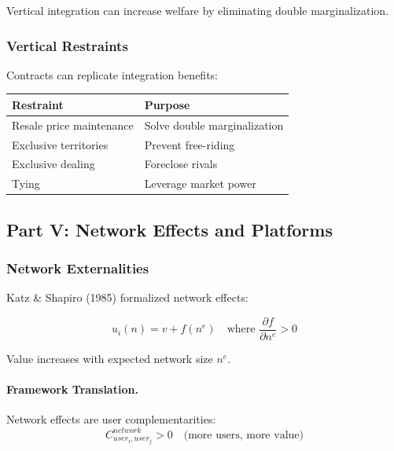 Vertical integration can increase welfare by eliminating double marginalization.

\subsubsection{Vertical Restraints}

Contracts can replicate integration benefits:

\begin{center}
\renewcommand{\arraystretch}{1.3}
\begin{tabular}{|l|l|}
\hline
\textbf{Restraint} & \textbf{Purpose} \\
\hline
Resale price maintenance & Solve double marginalization \\
Exclusive territories & Prevent free-riding \\
Exclusive dealing & Foreclose rivals \\
Tying & Leverage market power \\
\hline
\end{tabular}
\end{center}

\subsection{Part V: Network Effects and Platforms}

\subsubsection{Network Externalities}

Katz \& Shapiro (1985) formalized network effects:

\begin{equation}
\boxed{
u_i(n) = v + f(n^e) \quad \text{where } \frac{\partial f}{\partial n^e} > 0
}
\label{eq:network}
\end{equation}

Value increases with expected network size $n^e$.

\paragraph{Framework Translation.}
Network effects are user complementarities:
\begin{equation}
C_{user_i, user_j}^{network} > 0 \quad \text{(more users, more value)}
\end{equation}

